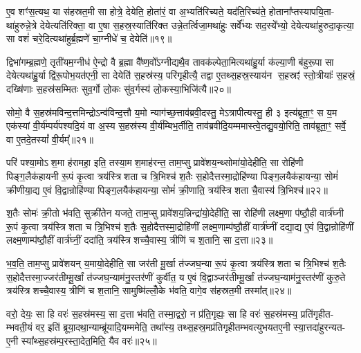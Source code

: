 ए॒व शꣳ॑स॒त्यथ॒ या स॑हस्रत॒मी सा होत्रे॒ देयेति॒ होता॑रं॒ वा अ॒भ्यति॑रिच्यते॒ यद॑ति॒रिच्य॑ते॒ होताना᳚प्तस्यापयि॒ता- था॑हुरुन्ने॒त्रे देयेत्यति॑रिक्ता॒ वा ए॒षा स॒हस्र॒स्याति॑रिक्त उन्ने॒तर्त्विजा॒मथा॑हुः॒ सर्वे᳚भ्यः सद॒स्ये᳚भ्यो॒ देयेत्यथा॑हुरुदा॒कृत्या॒ सा वशं॑ चरे॒दित्यथा॑हुर्ब्र॒ह्मणे॑ चा॒ग्नीधे॑ च॒ देयेति॑॥१९॥

द्विभा॑गम्ब्र॒ह्मणे॒ तृती॑यम॒ग्नीध॑ ऐ॒न्द्रो वै ब्र॒ह्मा वै᳚ष्ण॒वो᳚\-ऽग्नीद्यथै॒व तावक॑ल्पेता॒मित्यथा॑हु॒र्या क॑ल्या॒णी ब॑हुरू॒पा सा देयेत्यथा॑हु॒र्या द्वि॑रू॒पोभ॒यत॑एनी॒ सा देयेति॑ स॒हस्र॑स्य॒ परि॑गृहीत्यै॒ तद्वा ए॒तथ्स॒हस्र॒स्याय॑न स॒हस्रꣵ॑ स्तो॒त्रीयाः᳚ स॒हस्रं॒ दख्षि॑णाः स॒हस्र॑सम्मितः सुव॒र्गो लो॒कः सु॑व॒र्गस्य॑ लो॒कस्या॒भिजि॑त्यै॥२०॥

{\anuvakamend[{अ॒ब्र॒वी॒च्च॒ तद॒न्तरि॑ख्षन्ददात्यच्छावा॒कश्च॒ देयेति॑ स॒प्तच॑त्वारिशच्च॥५॥}]}

सोमो॒ वै स॒हस्र॑मविन्द॒त्तमिन्द्रो\-ऽन्व॑विन्द॒त्तौ य॒मो न्याग॑च्छ॒त्ताव॑ब्रवी॒दस्तु॒ मे\-ऽत्रापीत्यस्तु॒ ही ३ इत्य॑ब्रूता॒ꣳ॒ स य॒म एक॑स्यां वी॒र्य॑म्पर्य॑पश्यदि॒यं वा अ॒स्य स॒हस्र॑स्य वी॒र्य॑म्बिभ॒र्तीति॒ ताव॑ब्रवीदि॒यम्ममास्त्वे॒तद्यु॒वयो॒रिति॒ ताव॑ब्रूता॒ꣳ॒ सर्वे॒ वा ए॒तदे॒तस्यां᳚ वी॒र्यम्᳚॥२१॥

परि॑ पश्या॒मो\-ऽश॒मा ह॑रामहा॒ इति॒ तस्या॒मश॒माह॑रन्त॒ ताम॒प्सु प्रावे॑शय॒न्थ्सोमा॑यो॒देहीति॒ सा रोहि॑णी पिङ्ग॒लैक॑हायनी रू॒पं कृ॒त्वा त्रय॑स्त्रिशता च त्रि॒भिश्च॑ श॒तैः स॒होदैत्तस्मा॒द्रोहि॑ण्या पिङ्ग॒लयैक॑हायन्या॒ सोमं॑ क्रीणीया॒द्य ए॒वं वि॒द्वान्रोहि॑ण्या पिङ्ग॒लयैक॑हायन्या॒ सोमं॑ क्री॒णाति॒ त्रय॑स्त्रिशता चै॒वास्य॑ त्रि॒भिश्च॑॥२२॥

श॒तैः सोमः॑ क्री॒तो भ॑वति॒ सुक्री॑तेन यजते॒ ताम॒प्सु प्रावे॑शय॒न्निन्द्रा॑यो॒देहीति॒ सा रोहि॑णी लक्ष्म॒णा प॑ष्ठौ॒ही वार्त्र॑घ्नी रू॒पं कृ॒त्वा त्रय॑स्त्रिशता च त्रि॒भिश्च॑ श॒तैः स॒होदैत्तस्मा॒द्रोहि॑णीं लक्ष्म॒णाम्प॑ष्ठौ॒हीं वार्त्र॑घ्नीं दद्या॒द्य ए॒वं वि॒द्वान्रोहि॑णीं लक्ष्म॒णाम्प॑ष्ठौ॒हीं वार्त्र॑घ्नीं॒ ददा॑ति॒ त्रय॑स्त्रिशच्चै॒वास्य॒ त्रीणि॑ च श॒तानि॒ सा द॒त्ता॥२३॥

भ॒व॒ति॒ ताम॒प्सु प्रावे॑शयन् य॒मायो॒देहीति॒ सा जर॑ती मू॒र्खा त॑ज्जघ॒न्या रू॒पं कृ॒त्वा त्रय॑स्त्रिशता च त्रि॒भिश्च॑ श॒तैः स॒होदैत्तस्मा॒ज्जर॑तीम्मू॒र्खां त॑ज्जघ॒न्याम॑नु॒स्तर॑णीं कुर्वीत॒ य ए॒वं वि॒द्वाञ्जर॑तीम्मू॒र्खां त॑ज्जघ॒न्याम॑नु॒स्तर॑णीं कुरु॒ते त्रय॑स्त्रिशच्चै॒वास्य॒ त्रीणि॑ च श॒तानि॒ सामुष्मि॑ल्लोँ॒के भ॑वति॒ वागे॒व स॑हस्रत॒मी तस्मा᳚त्॥२४॥

वरो॒ देयः॒ सा हि वरः॑ स॒हस्र॑मस्य॒ सा द॒त्ता भ॑वति॒ तस्मा॒द्वरो॒ न प्र॑ति॒गृह्यः॒ सा हि वरः॑ स॒हस्र॑मस्य॒ प्रति॑गृहीत- म्भवती॒यं वर॒ इति॑ ब्रूया॒दथा॒न्याम्ब्रू॑यादि॒यम्ममेति॒ तथा᳚स्य॒ तथ्स॒हस्र॒मप्र॑तिगृहीतम्भवत्युभयतए॒नी स्या॒त्तदा॑हुरन्यत- ए॒नी स्या᳚थ्स॒हस्र॑म्प॒रस्ता॒देत॒मिति॒ यैव वरः॑॥२५॥

